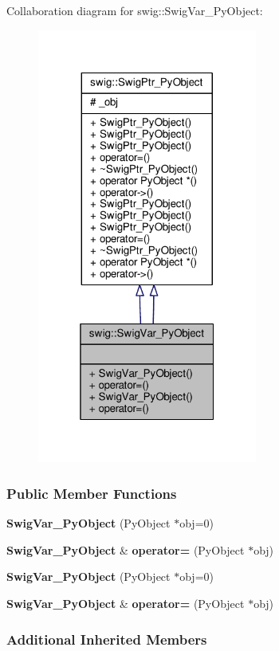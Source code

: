 Collaboration diagram for swig\+:\+:Swig\+Var\+\_\+\+Py\+Object\+:
\nopagebreak
\begin{figure}[H]
\begin{center}
\leavevmode
\includegraphics[width=205pt]{d5/d30/structswig_1_1SwigVar__PyObject__coll__graph}
\end{center}
\end{figure}
\subsubsection*{Public Member Functions}
\begin{DoxyCompactItemize}
\item 
{\bf Swig\+Var\+\_\+\+Py\+Object} (Py\+Object $\ast$obj=0)
\item 
{\bf Swig\+Var\+\_\+\+Py\+Object} \& {\bf operator=} (Py\+Object $\ast$obj)
\item 
{\bf Swig\+Var\+\_\+\+Py\+Object} (Py\+Object $\ast$obj=0)
\item 
{\bf Swig\+Var\+\_\+\+Py\+Object} \& {\bf operator=} (Py\+Object $\ast$obj)
\end{DoxyCompactItemize}
\subsubsection*{Additional Inherited Members}


